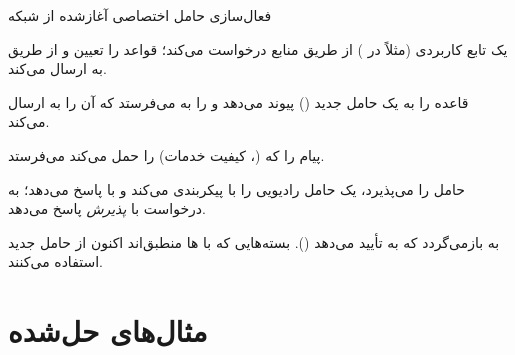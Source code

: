 \documentclass[11pt,a4paper]{article}
\begin{document}
\begin{acnfigure}
  \caption{ و حالت امنیتی  (\cref{proc:aka}).}
  \label{fig:aka}
\end{acnfigure}

\begin{procedurebox}{فعال‌سازی حامل اختصاصی آغازشده از شبکه}\label{proc:ded}
\begin{steps}
  \item یک تابع کاربردی (مثلاً  در ) از طریق  منابع درخواست می‌کند؛  قواعد
         را تعیین و از طریق  به  ارسال می‌کند.
  \item {} قاعده را به یک حامل جدید () پیوند می‌دهد و 
         را به  می‌فرستد که آن را به  ارسال می‌کند.
  \item {} پیام   را که  
        (، کیفیت خدمات) را حمل می‌کند می‌فرستد.
  \item {} حامل را می‌پذیرد، یک حامل رادیویی را با  پیکربندی می‌کند و با
         پاسخ می‌دهد؛  به درخواست  با \emph{پذیرش} پاسخ می‌دهد.
  \item {} به  بازمی‌گردد که به  تأیید می‌دهد (). بسته‌هایی که با
        ها منطبق‌اند اکنون از حامل جدید استفاده می‌کنند.
\end{steps}
\end{procedurebox}

\begin{acnfigure}
  \caption{فعال‌سازی حامل اختصاصی با تحریک سیاست (\cref{proc:ded}).}
  \label{fig:dedicated}
\end{acnfigure}

\section{مثال‌های حل‌شده}
\end{document}
